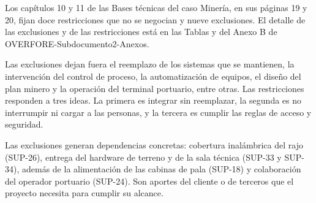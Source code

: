 \documentclass[subdoc]{../../comun/overfore}
\begin{document}
Los capítulos 10 y 11 de las Bases técnicas del caso Minería, en sus páginas 19 y 20, fijan doce restricciones que no se negocian y nueve exclusiones. El detalle de las exclusiones y de las restricciones está en las Tablas  y  del Anexo B de OVERFORE-Subdocumento2-Anexos.

Las exclusiones dejan fuera el reemplazo de los sistemas que se mantienen, la intervención del control de proceso, la automatización de equipos, el diseño del plan minero y la operación del terminal portuario, entre otras. Las restricciones responden a tres ideas. La primera es integrar sin reemplazar, la segunda es no interrumpir ni cargar a las personas, y la tercera es cumplir las reglas de acceso y seguridad.

Las exclusiones generan dependencias concretas: cobertura inalámbrica del rajo (SUP-26), entrega del hardware de terreno y de la sala técnica (SUP-33 y SUP-34), además de la alimentación de las cabinas de pala (SUP-18) y colaboración del operador portuario (SUP-24). Son aportes del cliente o de terceros que el proyecto necesita para cumplir su alcance.
\end{document}
